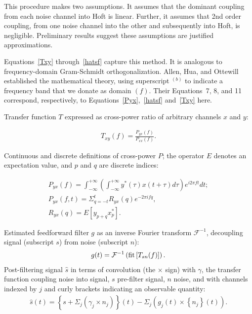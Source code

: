 This procedure makes two assumptions. It assumes that the dominant coupling from each noise channel into Hoft is linear. Further, it assumes that 2nd order coupling, from one noise channel into the other and subsequently into Hoft, is negligible. Preliminary results suggest these assumptions are justified approximations.  

	Equations~\ref{Txy} through~\ref{hatsf} capture this method. It is analogous to frequency-domain Gram-Schmidt orthogonalization. Allen, Hua, and Ottewill established the mathematical theory, using superscript $^{(b)}$ to indicate a frequency band that we donate as domain $(f)$. Their Equations~7, 8, and 11 correspond, respectively, to Equations~\ref{Pyx},~\ref{hatsf} and~\ref{Txy} here.


Transfer function $T$ expressed as cross-power ratio of arbitrary channels $x$ and $y$:

            \begin{eqnarray}
            T_{xy} (f) = \frac{P_{yx}(f)}{P_{xx}(f)}. \label{Txy}
            \end{eqnarray}

\noindent Continuous and discrete definitions of cross-power $P$; the operator $E$ denotes an expectation value, and $p$ and $q$ are discrete indices:
 
            \begin{eqnarray}
            P_{yx} (f) = \int_{-\infty}^{+\infty} \left(\int_{-\infty}^{+\infty} y^{*} (\tau) x(t+\tau) d \tau \right) e^{i 2 \pi f t} dt; \label{Pyx} \\
            P_{yx} (f, t) = \Sigma_{q=-t}^{t} R_{yx} (q) e^{-2 \pi i f q}, \label{Pyxext} \\
            R_{yx} (q) = E\left[ y_{p+q} x_p^* \right] \label{crossCovar}.
            \end{eqnarray}

\noindent Estimated feedforward filter $g$ as an inverse Fourier transform $\mathcal{F}^{-1}$, decoupling signal (subscript $s$) from noise (subscript $n$):
            \begin{eqnarray}
            g(t) = \mathcal{F}^{-1} \left( \textup{fit} \left[ T_{sn} (f) \right] \right) \label{gcf}.
            \end{eqnarray}
\noindent Post-filtering signal $\hat{s}$ in terms of convolution (the $\times$ sign) with $\gamma$, the transfer function coupling noise into signal, $s$ pre-filter signal, $n$ noise, and with channels indexed by $j$ and curly brackets indicating an observable quantity: 
            \begin{eqnarray}
            \hat{s} (t) = \left\{ s + \Sigma_j \left(\gamma_j \times n_j\right)\right\} (t) - \Sigma_j \left(g_{j} (t) \times \left\{ n_{j} \right\} (t)\right) \label{hatsf}.
            \end{eqnarray}

